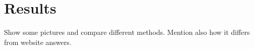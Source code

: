\chapter{Results}
\label{chap:results}

Show some pictures and compare different methods. Mention also how it differs
from website answers.
